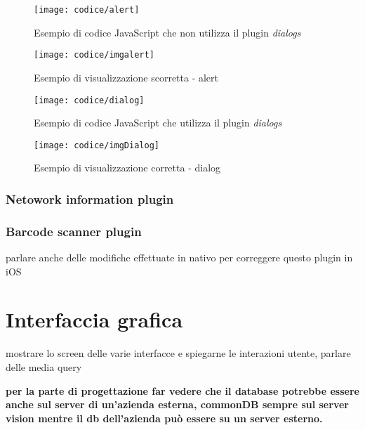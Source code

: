 \begin{figure}[!h] 
    \centering 
    \texttt{[image: codice/alert]} 
    \caption{Esempio di codice JavaScript che non utilizza il plugin \textit{dialogs}}
\end{figure}

\newpage

\begin{figure}[!h] 
    \centering 
    \texttt{[image: codice/imgalert]} 
    \caption{Esempio di visualizzazione scorretta - alert}
\end{figure}

\begin{figure}[!h] 
    \centering 
    \texttt{[image: codice/dialog]} 
    \caption{Esempio di codice JavaScript che utilizza il plugin \textit{dialogs}}
\end{figure}

\begin{figure}[!h] 
    \centering 
    \texttt{[image: codice/imgDialog]} 
    \caption{Esempio di visualizzazione corretta - dialog}
\end{figure}

\subsubsection{Netowork information plugin}

\subsubsection{Barcode scanner plugin}
parlare anche delle modifiche effettuate in nativo per correggere questo plugin in iOS

\section{Interfaccia grafica}

mostrare lo screen delle varie interfacce e spiegarne le interazioni utente, parlare delle media query

\textbf{per la parte di progettazione far vedere che il database potrebbe essere anche sul server di un'azienda esterna, commonDB sempre sul server vision mentre il db dell'azienda può essere su un server esterno.}
